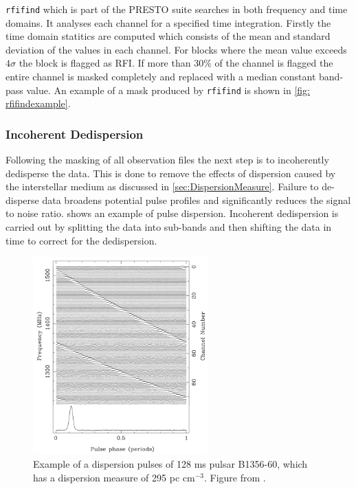 \texttt{rfifind} which is part of the PRESTO suite searches in both frequency and time domains. It analyses each channel for a specified time integration. Firstly the time domain statitics are computed which consists of the mean and standard deviation of the values in each channel. For blocks where the mean value exceeds $4\sigma$ the block is flagged as RFI. If more than 30\% of the channel is flagged the entire channel is masked completely and replaced with a median constant band-pass value. An example of a mask produced by \texttt{rfifind} is shown in \cref{fig: rfifindexample}. 

\subsubsection{Incoherent Dedispersion}

Following the masking of all observation files the next step is to incoherently dedisperse the data. This is done to remove the effects of dispersion caused by the interstellar medium as discussed in \cref{sec:DispersionMeasure}. Failure to de-disperse data broadens potential pulse profiles and significantly reduces the signal to noise ratio.  shows an example of pulse dispersion. Incoherent dedispersion is carried out by splitting the data into sub-bands and then shifting the data in time to correct for the dedispersion. 


\begin{figure}
    \centering
    \includegraphics[width = 0.6\textwidth]{figs/DM_pulse_example.png}
    \caption{Example of a dispersion pulses of 128 ms pulsar B1356-60, which has a dispersion measure of 295 pc cm$^{-3}$. Figure from \citet[p.~20]{pulsar_handbook}.}
    \label{fig: DM_pulse_example}
\end{figure}

